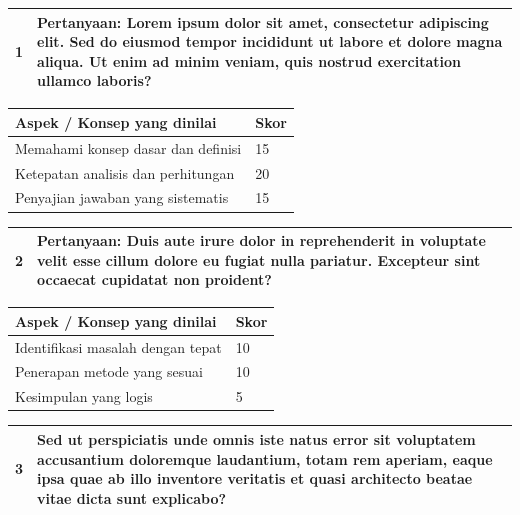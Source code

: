 \documentclass[12pt,a4paper]{article}
\renewcommand{\arraystretch}{1.0}
\begin{document}
\noindent
\renewcommand{\arraystretch}{1.2}
\begin{tabular}{|>{\centering}m{2cm}|p{13cm}|}
\hline
\textbf{1} & \textbf{Pertanyaan:} Lorem ipsum dolor sit amet, consectetur adipiscing elit. Sed do eiusmod tempor incididunt ut labore et dolore magna aliqua. Ut enim ad minim veniam, quis nostrud exercitation ullamco laboris? \\
\hline
\end{tabular}

\noindent
\renewcommand{\arraystretch}{1.2}
\begin{tabular}{|p{12cm}|p{3cm}|}
\hline
\textbf{Aspek / Konsep yang dinilai} & \textbf{Skor} \\
\hline
Memahami konsep dasar dan definisi & 15 \\
\hline
Ketepatan analisis dan perhitungan & 20 \\
\hline
Penyajian jawaban yang sistematis & 15 \\
\hline
\end{tabular}

\vspace{0.5cm}

\noindent
\renewcommand{\arraystretch}{1.2}
\begin{tabular}{|>{\centering}m{2cm}|p{13cm}|}
\hline
\textbf{2} & \textbf{Pertanyaan:} Duis aute irure dolor in reprehenderit in voluptate velit esse cillum dolore eu fugiat nulla pariatur. Excepteur sint occaecat cupidatat non proident? \\
\hline
\end{tabular}

\noindent
\renewcommand{\arraystretch}{1.2}
\begin{tabular}{|p{12cm}|p{3cm}|}
\hline
\textbf{Aspek / Konsep yang dinilai} & \textbf{Skor} \\
\hline
Identifikasi masalah dengan tepat & 10 \\
\hline
Penerapan metode yang sesuai & 10 \\
\hline
Kesimpulan yang logis & 5 \\
\hline
\end{tabular}

\newpage

\noindent
\renewcommand{\arraystretch}{1.2}
\begin{tabular}{|>{\centering}m{2cm}|p{13cm}|}
\hline
\textbf{3} & Sed ut perspiciatis unde omnis iste natus error sit voluptatem accusantium doloremque laudantium, totam rem aperiam, eaque ipsa quae ab illo inventore veritatis et quasi architecto beatae vitae dicta sunt explicabo? \\
\hline
\end{tabular}
\end{document}
